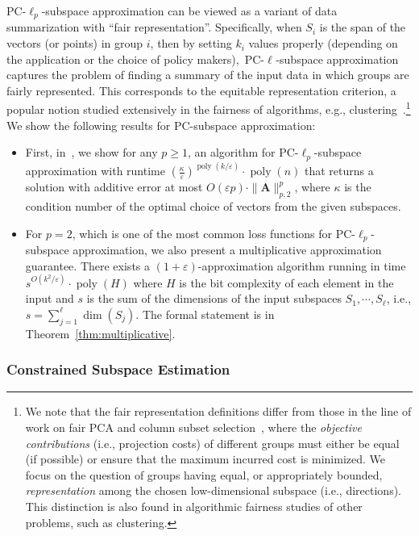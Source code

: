 \documentclass[11pt]{article}
\theoremstyle{plain}
\theoremstyle{plain}
\theoremstyle{definition}
\theoremstyle{plain}
\theoremstyle{remark}
\newcommand{\poly}{\operatorname{poly}}
\DeclareRobustCommand{\fairSAp}[1]{PC-$\ell_{#1}$-subspace approximation}
\begin{document}
\fairSAp{p} can be viewed as a variant of data summarization with ``fair representation''. Specifically, when $S_i$ is the span of the vectors (or points) in group $i$, then by setting $k_i$ values properly (depending on the application or the choice of policy makers),~\fairSAp{} captures the problem of finding a summary of the input data in which groups are fairly represented. This corresponds to the equitable representation criterion, a popular notion studied extensively in the fairness of algorithms, e.g., clustering~\cite{kleindessner2019fair,jones2020fair,chiplunkar2020solve,hotegni2023approximation}.\footnote{We note that the fair representation definitions differ from those in the line of work on fair PCA and column subset selection~\cite{samadi2018price,tantipongpipat2019multi,matakos2023fair,song2024socially}, where the \emph{objective contributions} (i.e., projection costs) of different groups must either be equal (if possible) or ensure that the maximum incurred cost is minimized. 
We focus on the question of groups having equal, or appropriately bounded, \emph{representation} among the chosen low-dimensional subspace (i.e., directions). This distinction is also found in algorithmic fairness studies of other problems, such as clustering.}
We show the following results for PC-subspace approximation: 
\begin{itemize}
    \item First, in~, we show for any $p\ge 1$, an algorithm for \fairSAp{p} with runtime $(\frac{\kappa}{\varepsilon})^{\poly({k}/{\varepsilon})}\cdot \poly(n)$  that returns a solution with additive error at most $O(\varepsilon p)\cdot\|\bm{A}\|^p_{p,2}$, where $\kappa$ is the condition number of the optimal choice of vectors from the given subspaces.

    \item For $p=2$, which is one of the most common loss functions for \fairSAp{p}, we also present a multiplicative approximation guarantee. There exists a $(1+\varepsilon)$-approximation algorithm running in time $s^{O(k^2/\varepsilon)} \cdot \poly(H)$ where $H$ is the bit complexity of each element in the input and $s$ is the sum of the dimensions of the input subspaces $S_1, \cdots, S_\ell$, i.e., $s = \sum_{j=1}^\ell \dim(S_j)$. The formal statement is in Theorem~\ref{thm:multiplicative}. 

\end{itemize}

\subsubsection{Constrained Subspace Estimation}
\end{document}
